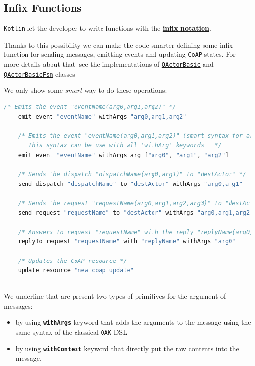 \subsection{Infix Functions}

\texttt{Kotlin} let the developer to write functions with the \href{https://kotlinlang.org/docs/functions.html#infix-notation}{\textbf{infix notation}}.

Thanks to this possibility we can make the code smarter defining some infix function for sending messages, emitting events and updating \texttt{CoAP} states. For more details about that, see the implementations of \href{https://github.com/LM-96/QA-Extensions/blob/main/it.unibo.qakactor/src/main/kotlin/QActorBasic.kt}{\texttt{QActorBasic}} and \href{https://github.com/LM-96/QA-Extensions/blob/main/it.unibo.qakactor/src/main/kotlin/QActorBasicFsm.kt}{\texttt{QActorBasicFsm}} classes.

We only show some \textit{smart} way to do these operations:
\begin{lstlisting}[language=kotlin, morekeywords={emit, event, withArgs, send, dispatch, request, replyTo, with, update, resource, arg}]
	/* Emits the event "eventName(arg0,arg1,arg2)" */
	emit event "eventName" withArgs "arg0,arg1,arg2"
	
	/* Emits the event "eventName(arg0,arg1,arg2)" (smart syntax for args)
	   This syntax can be use with all 'withArg' keywords	*/
	emit event "eventName" withArgs arg ["arg0", "arg1", "arg2"]
	
	/* Sends the dispatch "dispatchName(arg0,arg1)" to "destActor" */
	send dispatch "dispatchName" to "destActor" withArgs "arg0,arg1"
	
	/* Sends the request "requestName(arg0,arg1,arg2,arg3)" to "destActor" */
	send request "requestName" to "destActor" withArgs "arg0,arg1,arg2,arg3"
	
	/* Answers to request "requestName" with the reply "replyName(arg0)" */
	replyTo request "requestName" with "replyName" withArgs "arg0"
	
	/* Updates the CoAP resource */
	update resource "new coap update"
	
\end{lstlisting}
 
We underline that are present two types of primitives for the argument of messages:
\begin{itemize}
	\item by using \textbf{\texttt{withArgs}} keyword that adds the arguments to the message using the same syntax of the classical \texttt{QAK} DSL;
	\item by using \textbf{\texttt{withContext}} keyword that directly put the raw contents into the message. 
\end{itemize}
